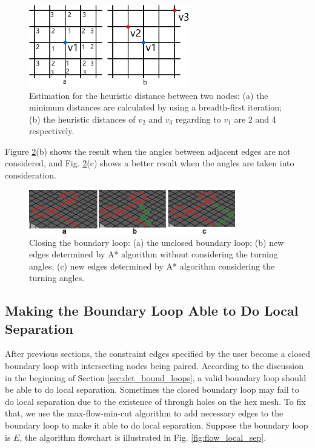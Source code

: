 \documentclass[final,5p,times,twocolumn]{elsarticle}
\begin{document}
\begin{figure}[htbp]
\begin{center}
\includegraphics[width=7cm]{A_start_estimation.png}
\caption{Estimation for the heuristic distance between two nodes: (a) the minimum distances are calculated by using a breadth-first iteration; (b) the heuristic distances of $v_2$ and $v_3$ regarding to $v_1$ are 2 and 4 respectively.}
\label{fig:A_start_estimation}
\end{center}
\end{figure}

Figure \ref{fig:close_loop}(b) shows the result when the angles between adjacent edges are not considered, and Fig. \ref{fig:close_loop}(c) shows a better result when the angles are taken into consideration.

\begin{figure}[htbp]
\begin{center}
\includegraphics[width=9cm]{close_loop.png}
\caption{Closing the boundary loop: (a) the unclosed boundary loop; (b) new edges determined by A* algorithm without considering the turning angles; (c) new edges determined by A* algorithm considering the turning angles.}
\label{fig:close_loop}
\end{center}
\end{figure}

\subsection{Making the Boundary Loop Able to Do Local Separation}
\label{sec:local_separation}
After previous sections, the constraint edges specified by the user become a closed boundary loop with intersecting nodes being paired. According to the discussion in the beginning of Section \ref{sec:det_bound_loops}, a valid boundary loop should be able to do local separation. Sometimes the closed boundary loop may fail to do local separation due to the existence of through holes on the hex mesh. To fix that, we use the max-flow-min-cut algorithm to add necessary edges to the boundary loop to make it able to do local separation. Suppose the boundary loop is $E$, the algorithm flowchart is illustrated in Fig. \ref{fig:flow_local_sep}.
\end{document}
